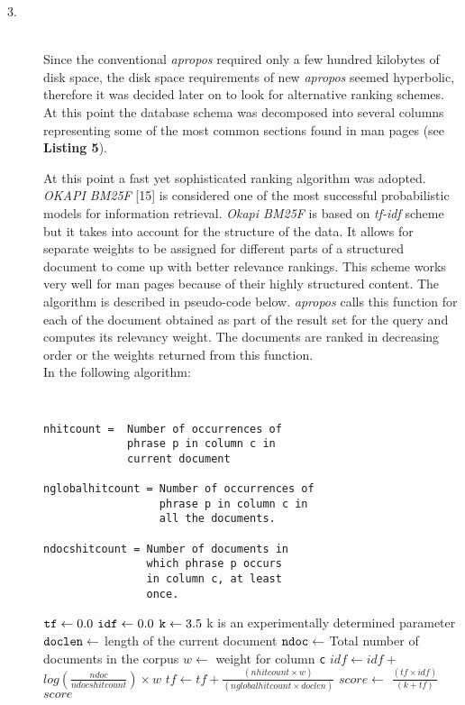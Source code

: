 \documentclass[letterpaper,twocolumn,10pt]{article}
\begin{document}
\begin{description}
\item[3.] \hfill \\
Since the conventional \textit{apropos} required only a few hundred kilobytes of
disk space, the disk space requirements of new \textit{apropos} seemed
hyperbolic, therefore it was decided later on to look for alternative ranking
schemes. At this point the database schema was decomposed into several columns
representing some of the most common sections found in man pages
(see {\bf Listing 5}).

At this point a fast yet sophisticated ranking algorithm was adopted.
\emph{OKAPI BM25F} [15] is considered one of the most successful probabilistic
models for information retrieval. \emph{Okapi BM25F} is based on \emph{tf-idf}
scheme but it takes into account for the structure of the data. It allows for
separate weights to be assigned for different parts of a structured document to
come up with better relevance rankings. This scheme works very well for man pages
because of their highly structured content. The algorithm is described in pseudo-code below. \textit{apropos} calls this function for each of the document
obtained as part of the result set for the query and computes its relevancy
weight. The documents are ranked in decreasing order or the weights returned
from this function. \\

In the following algorithm: \\
{\tt
{}
\begin{lstlisting}
nhitcount =  Number of occurrences of
             phrase p in column c in
             current document

nglobalhitcount = Number of occurrences of
                  phrase p in column c in
                  all the documents.

ndocshitcount = Number of documents in
                which phrase p occurs
                in column c, at least
                once.
\end{lstlisting}
}


\begin{algorithmic}
\State ${\tt tf} \gets 0.0$
\State ${\tt idf} \gets 0.0$
\State ${\tt k} \gets 3.5$
\Comment 
{k is an experimentally determined parameter}
\State ${\tt doclen} \gets $ length of the current document
\State ${\tt ndoc} \gets $ Total number of documents in the corpus
\State $w \gets $ weight for column {\tt c}
\State $idf \gets idf + $ $log(\frac{ndoc}{ndocshitcount})\times w $
\State $tf \gets tf + \frac{(nhitcount \times w)}{(nglobalhitcount \times doclen)}$
\EndFor
\EndFor
\State $score \gets $ $\frac{(tf \times idf)}{(k + tf)}$ \\
\Return $score$
\end{algorithmic}

\end{description}
\end{document}

